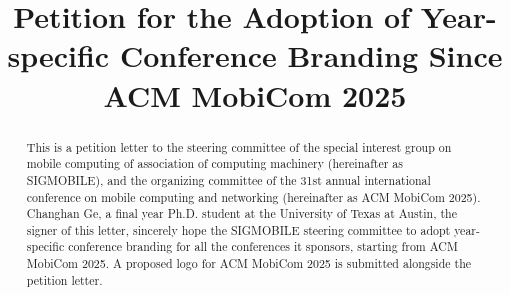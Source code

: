 \documentclass[sigconf, 10pt]{acmart}
\begin{document}
\title{Petition for the Adoption of Year-specific Conference Branding Since ACM MobiCom 2025}

\newcommand{\wrt}{{\em w.r.t. }}
\newcommand{\para}[1]{\smallskip\noindent {\bf #1}}

\setlength{\abovecaptionskip}{0pt}
\setlength{\belowcaptionskip}{0pt}
\setlength{\abovedisplayshortskip}{0pt}
\setlength{\belowdisplayshortskip}{0pt}
\setlength{\textfloatsep}{0pt}

\begin{abstract}
This is a petition letter to the steering committee of the special interest group on mobile computing of association of computing machinery (hereinafter as SIGMOBILE), and the organizing committee of the 31st annual international conference on mobile computing and networking (hereinafter as ACM MobiCom 2025). Changhan Ge, a final year Ph.D. student at the University of Texas at Austin, the signer of this letter, sincerely hope the SIGMOBILE steering committee to adopt year-specific conference branding for all the conferences it sponsors, starting from ACM MobiCom 2025. A proposed logo for ACM MobiCom 2025 is submitted alongside the petition letter.
\end{abstract}




\maketitle
\end{document}
